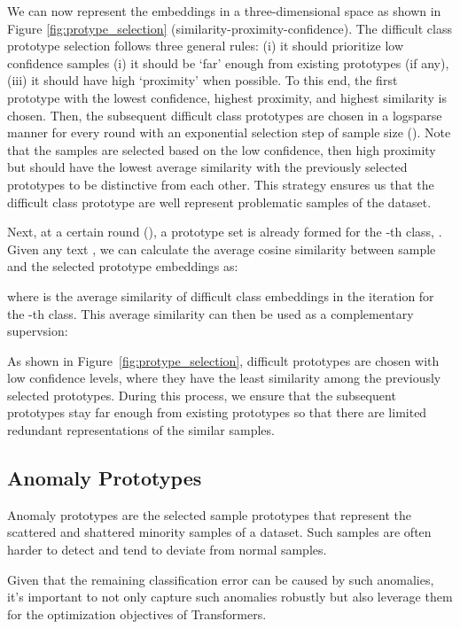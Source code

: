 \documentclass[letterpaper]{article} \usepackage{aaai22}  \usepackage{times}  \usepackage{helvet}  \usepackage{courier}  \usepackage{amsmath,amssymb}
\begin{document}
We can now represent the embeddings in a three-dimensional space as shown in Figure \ref{fig:protype_selection} (similarity-proximity-confidence). 
The difficult class prototype selection follows three general rules: (i) it should prioritize low confidence samples (i) it should be `far' enough from existing prototypes (if any), (iii) it should have high `proximity' when possible. 
To this end, the first prototype with the lowest confidence, highest proximity, and highest similarity is chosen. Then, the subsequent difficult class prototypes are chosen in a logsparse~\cite{li2019enhancing} manner for every round with an exponential selection step of sample size (). 
Note that the samples are selected based on the low confidence, then high proximity but should have the lowest average similarity with the previously selected prototypes to be distinctive from each other. This strategy ensures us that the difficult class prototype are well represent problematic samples of the dataset.


Next, at a certain round (), a prototype set  is already formed for the -th class, . Given any text , we can calculate the average cosine similarity between sample  and the selected prototype embeddings as:

where  is the average similarity of difficult class embeddings in the  iteration for the -th class. This average similarity can then be used as a complementary supervsion:



As shown in Figure~\ref{fig:protype_selection}, difficult prototypes are chosen with low confidence levels, where they have the least similarity among the previously selected prototypes. During this process, we ensure that the subsequent prototypes stay far enough from existing prototypes so that there are limited redundant representations of the similar samples.





\subsection{Anomaly Prototypes}
\label{subsec:ap}

Anomaly prototypes are the selected sample prototypes that represent the scattered and shattered minority samples of a dataset. Such samples are often harder to detect and tend to deviate from normal samples. 

Given that the remaining classification error can be caused by such anomalies, it's important to not only capture such anomalies robustly but also leverage them for the optimization objectives of Transformers.
\end{document}
